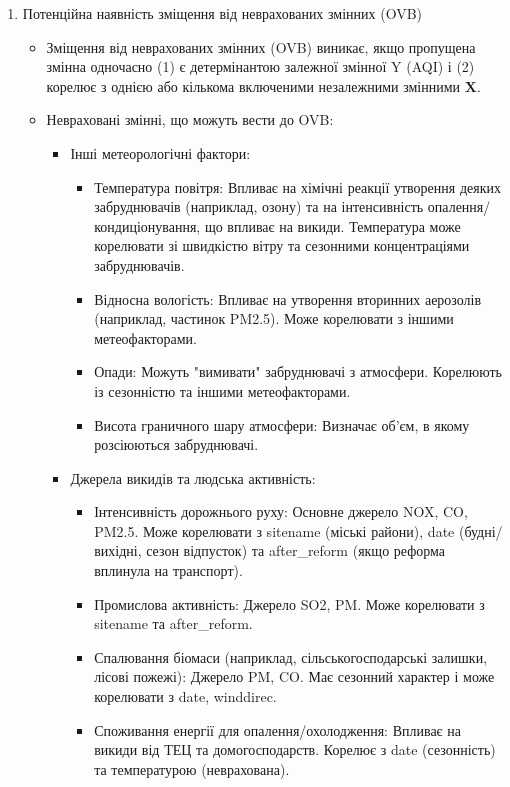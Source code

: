 \documentclass{article}
\begin{document}
\begin{enumerate}
    \item Потенційна наявність зміщення від неврахованих змінних (OVB)
    \begin{itemize}
        \item Зміщення від неврахованих змінних (OVB) виникає, якщо пропущена змінна одночасно (1) є детермінантою залежної змінної Y (AQI) і (2) корелює з однією або кількома включеними незалежними змінними $\mathbf{X}$.
        \item Невраховані змінні, що можуть вести до OVB:
        \begin{itemize}
            \item Інші метеорологічні фактори:
            \begin{itemize}
                \item Температура повітря: Впливає на хімічні реакції утворення деяких забруднювачів (наприклад, озону) та на інтенсивність опалення/кондиціонування, що впливає на викиди. Температура може корелювати зі швидкістю вітру та сезонними концентраціями забруднювачів.
                \item Відносна вологість: Впливає на утворення вторинних аерозолів (наприклад, частинок PM2.5). Може корелювати з іншими метеофакторами.
                \item Опади: Можуть "вимивати" забруднювачі з атмосфери. Корелюють із сезонністю та іншими метеофакторами.
                \item Висота граничного шару атмосфери: Визначає об'єм, в якому розсіюються забруднювачі.
            \end{itemize}
            \item Джерела викидів та людська активність:
            \begin{itemize}
                \item Інтенсивність дорожнього руху: Основне джерело NOX, CO, PM2.5. Може корелювати з sitename (міські райони), date (будні/вихідні, сезон відпусток) та after\_reform (якщо реформа вплинула на транспорт).
                \item Промислова активність: Джерело SO2, PM. Може корелювати з sitename та after\_reform.
                \item Спалювання біомаси (наприклад, сільськогосподарські залишки, лісові пожежі): Джерело PM, CO. Має сезонний характер і може корелювати з date, winddirec.
                \item Споживання енергії для опалення/охолодження: Впливає на викиди від ТЕЦ та домогосподарств. Корелює з date (сезонність) та температурою (неврахована).

\end{itemize}
\end{itemize}
\end{itemize}
\end{enumerate}
\end{document}
